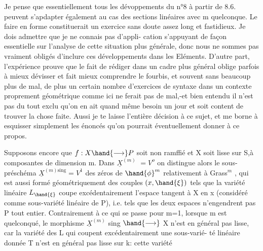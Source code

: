 




Je pense que essentiellement tous les dévoppements du n°8 à
partir de 8.6. peuvent s'apdapter également au cas des sections linéaires avec
m quelconque. Le faire en forme constituerait un exercice sans doute
assez long et fastidieux. Je dois admettre que je ne connais pas d'appli-%
cation s'appuyant de façon essentielle sur l'analyse de cette situation
plus générale, donc nous ne sommes pas vraiment obligés d'inclure ces
développements dans les Eléments. D'autre part, l'expérience prouve que
le fait de rédiger dans un cadre plus général oblige parfois à mieux
dévisser et fait mieux comprendre le fourbis, et souvent sans beaucoup
plus de mal, de plus un certain nombre d'exercices de syntaxe dans un
contexte proprement géométrique comme ici ne ferait pas de mal,-et
bien entendu il n'est pas du tout exclu qu'on en ait quand même besoin
un jour et soit content de trouver la chose faite. Aussi je te laisse
l'entière décision à ce sujet, et me borne à esquisser simplement les
énoncés qu'on pourrait éventuellement donner à ce propos.

Supposons encore que $f:X \hand{\longrightarrow} P$ soit non ramffié et X soit lisse sur
S,à composantes de dimension \hand{$\geq$} m. %
Dans $\underline{X}^{(m)}$ $=V^o$ on distingue alors le sous-préschéma $\underline{X}^{(m)\mathrm{sing}} = V^1$
des zéros  de $\hand{\phi}^m$ relativement à Grass$^m$ , qui est aussi formé
géométriquement des couples $(x,\hand{\xi})$ tels que la variété linéaire $L_{\hand{\xi}}$
coupe excédentairement l'espace tangent à X en x (considéré comme
sous-variété linéaire de P), i.e. tels que les deux espaces n'engendrent
pas P tout entier. Contrairement à ce qui se passe pour m=1, lorsque
m est quelconqué, le morphisme $\underline{X}^{(m)}$ sing $\hand{\longrightarrow}$ X n'est en général pas
lisse, car la variété des L qui %
coupent excédentairement une sous-varié-%
té linéaire donnée T n'est en général pas lisse sur k: cette variété

